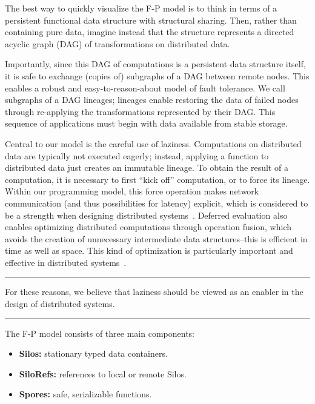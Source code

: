 \documentclass[preprint]{sigplanconf}
\theoremstyle{definition}
\theoremstyle{definition}
\begin{document}
The best way to quickly visualize the F-P model is to think in terms of a
persistent functional data structure with structural sharing. Then, rather
than containing pure data, imagine instead that the structure represents a
directed acyclic graph (DAG) of transformations on distributed data.

Importantly, since this DAG of computations is a persistent data structure
itself, it is safe to exchange (copies of) subgraphs of a DAG between remote
nodes. This enables a robust and easy-to-reason-about model of fault
tolerance. We call subgraphs of a DAG lineages; lineages enable restoring the
data of failed nodes through re-applying the transformations represented by
their DAG. This sequence of applications must begin with data available from
stable storage.

Central to our model is the careful use of laziness. Computations on
distributed data are typically not executed eagerly; instead, applying a
function to distributed data just creates an immutable lineage. To obtain the
result of a computation, it is necessary to first ``kick off'' computation, or
to force its lineage. Within our programming model, this force
operation makes network communication (and thus
possibilities for latency) explicit, which is considered to be a strength when
designing distributed systems~\cite{ANoteDistComp}. Deferred evaluation also
enables optimizing distributed computations through operation fusion, which
avoids the creation of unnecessary intermediate data structures--this is
efficient in time as well as space. This kind of optimization is particularly
important and effective in distributed systems~\cite{FlumeJava}.

\vspace{-3mm}
\begin{center}\noindent\rule{8cm}{0.4pt}\end{center}
\begin{displayquote}
For these reasons, we believe that laziness should be viewed as an enabler in
the design of distributed systems.
\end{displayquote}
\vspace{-4mm}
\begin{center}\noindent\rule{8cm}{0.4pt}\end{center}
\vspace{1mm}

\noindent The F-P model consists of three main components:
\begin{itemize}[noitemsep]
  \item {\bf Silos:} stationary typed data containers.
  \item {\bf SiloRefs:} references to local or remote Silos.
  \item {\bf Spores:} safe, serializable functions.
\end{itemize}
\vspace{1mm}
\end{document}
